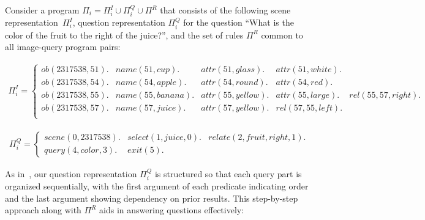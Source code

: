 \begin{example}
    Consider a program $\Pi_i = \Pi^{I}_{i} \cup \Pi^{Q}_{i} \cup \Pi^{R}$ that consists of the following scene representation~$\Pi^{I}_{i}$, question representation $\Pi^{Q}_{i}$ for the question ``What is the color of the fruit to the right of the juice?'', and the set of rules $\Pi^{R}$ common to all image-query program pairs:

    \begin{equation*}
        \begin{array}{cc}
            \Pi^{I}_{i} = \left\{
            \begin{array}{lllll}
                ob(2317538, 51). &
                name(51, cup). &
                attr(51, glass). & 
                attr(51, white). \\
                ob(2317538, 54).  &
                name(54, apple).  &
                attr(54, round).  &
                attr(54, red).  \\
                ob(2317538, 55).  &
                name(55, banana).  &
                attr(55, yellow).  & attr(55, large). & rel(55,57,right). \\ 
                ob(2317538, 57).  &
                name(57, juice).  &
                attr(57, yellow).  & rel(57,55,left). \\ 
            \end{array}
            \right.
            \end{array}
    \end{equation*}
    
    \begin{equation*}
        \begin{array}{cc}
            \Pi^{Q}_{i} = \left\{
            \begin{array}{lll}
                scene(0, 2317538).  &
                select(1,juice,0).  &
                relate(2,fruit,right,1).  \\
                query(4,color,3).  &
                exit(5). 
            \end{array}
            \right.
        \end{array}
    \end{equation*}

\noindent
As in~\cite{eiter2022neuro}, our question representation $\Pi^{Q}_i$ is structured so that each query part is organized sequentially, with the first argument of each predicate indicating order and the last argument showing dependency on prior results. This step-by-step approach along with $\Pi^{R}$ aids in answering questions effectively:


\end{example}
